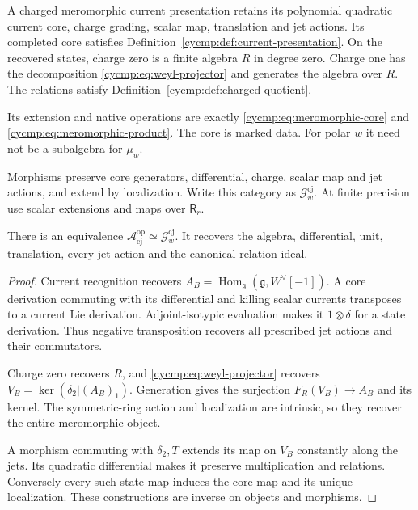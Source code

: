 A charged meromorphic current presentation retains its polynomial
quadratic current core, charge grading, scalar map, translation and
jet actions. Its completed core satisfies
Definition~\ref{cycmp:def:current-presentation}. On the recovered
states, charge zero is a finite algebra $R$ in degree zero.
Charge one has the decomposition \eqref{cycmp:eq:weyl-projector}
and generates the algebra over $R$. The relations satisfy
Definition~\ref{cycmp:def:charged-quotient}.

Its extension and native
operations are exactly \eqref{cycmp:eq:meromorphic-core} and
\eqref{cycmp:eq:meromorphic-product}. The core is marked data.
For polar $w$ it need not be a subalgebra for $\mu_w$.

Morphisms preserve core generators, differential, charge, scalar
map and jet actions, and extend by localization. Write this category
as $\mathcal G_w^{\mathrm{cj}}$. At finite precision use scalar
extensions and maps over $\mathsf R_r$.

\begin{proposition}\label{cycmp:prop:charged-recognition}
There is an equivalence
$\mathcal A_{\mathrm{cj}}^{\mathrm{op}}\simeq\mathcal G_w^{\mathrm{cj}}$.
It recovers the algebra, differential, unit, translation, every jet
action and the canonical relation ideal.
\end{proposition}

\begin{proof}
Current recognition recovers
$A_B=\operatorname{Hom}_{\mathfrak g}(\mathfrak g,W^\vee[-1])$.
A core derivation commuting with its differential and killing scalar
currents transposes to a current Lie derivation. Adjoint-isotypic
evaluation makes it $1\otimes\delta$ for a state derivation.
Thus negative transposition recovers all prescribed jet actions
and their commutators.

Charge zero recovers $R$, and \eqref{cycmp:eq:weyl-projector} recovers
$V_B=\ker(\delta_2|(A_B)_1)$. Generation gives the surjection
$F_R(V_B)\to A_B$ and its kernel. The symmetric-ring action and
localization are intrinsic, so they recover the entire meromorphic
object.

A morphism commuting with $\delta_2,T$ extends its map on
$V_B$ constantly along the jets. Its quadratic differential makes
it preserve multiplication and relations. Conversely every such
state map induces the core map and its unique localization. These
constructions are inverse on objects and morphisms.
\end{proof}

